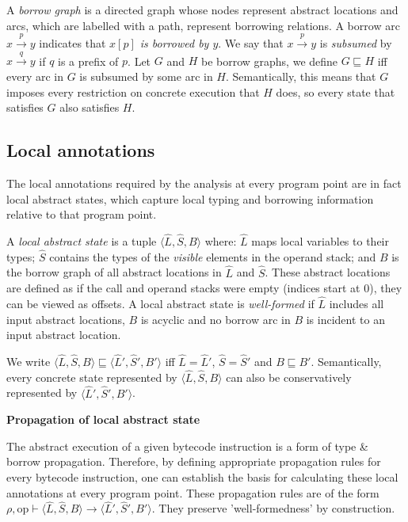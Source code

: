 A \textit{borrow graph} is a directed graph whose nodes represent abstract locations and arcs, which are labelled with a path, represent borrowing relations. A borrow arc $x \stackrel{p}{\rightarrow} y$ indicates that \textit{$x[p]$ is borrowed by $y$}. We say that $x \stackrel{p}{\rightarrow} y$ is \textit{subsumed} by $x \stackrel{q}{\rightarrow} y$ if $q$ is a prefix of $p$. Let $G$ and $H$ be borrow graphs, we define $G \sqsubseteq H$ iff every arc in $G$ is subsumed by some arc in $H$. Semantically, this means that $G$ imposes every restriction on concrete execution that $H$ does, so every state that satisfies $G$ also satisfies $H$.

\subsection{Local annotations}

The local annotations required by the analysis at every program point are in fact local abstract states, which capture local typing and borrowing information relative to that program point.

A \textit{local abstract state} is a tuple $\langle \hat{L},\hat{S},B \rangle$ where: $\hat{L}$ maps local variables to their types; $\hat{S}$ contains the types of the \textit{visible} elements in the operand stack; and $B$ is the borrow graph of all abstract locations in $\hat{L}$ and $\hat{S}$. These abstract locations are defined as if the call and operand stacks were empty (indices start at 0), they can be viewed as offsets. A local abstract state is \textit{well-formed} if $\hat{L}$ includes all input abstract locations, $B$ is acyclic and no borrow arc in $B$ is incident to an input abstract location.

We write $\langle \hat{L},\hat{S},B \rangle \sqsubseteq \langle \hat{L}',\hat{S}',B' \rangle$ iff $\hat{L} = \hat{L}'$, $\hat{S} = \hat{S}'$ and $B \sqsubseteq B'$. Semantically, every concrete state represented by $\langle \hat{L},\hat{S},B \rangle$ can also be conservatively represented by $\langle \hat{L}',\hat{S}',B' \rangle$.

\vspace{0.1cm}

\noindent\textbf{Propagation of local abstract state}

The abstract execution of a given bytecode instruction is a form of type \& borrow propagation. Therefore, by defining appropriate propagation rules for every bytecode instruction, one can establish the basis for calculating these local annotations at every program point.
These propagation rules are of the form $\rho, \text{op} \vdash \langle \hat{L},\hat{S},B \rangle \rightarrow \langle \hat{L}',\hat{S}',B' \rangle$. They preserve 'well-formedness' by construction.


